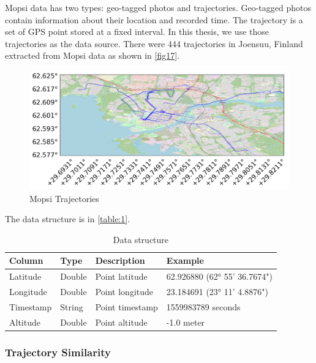 \documentclass[a4paper, 12pt]{article}
\begin{document}
Mopsi data has two types: geo-tagged photos and trajectories. Geo-tagged photos contain information about their location and recorded time. The trajectory is a set of GPS point stored at a fixed interval. In this thesis, we use those trajectories as the data source. There were 444 trajectories in Joensuu, Finland extracted from Mopsi data as shown in \autoref{fig17}.

\begin{figure}[ht]
    \centering
    \includegraphics[width=1\textwidth]{Mopsi Trajectories.png}
    \caption{Mopsi Trajectories}
    \label{fig17}
\end{figure}

The data structure is in \autoref{table:1}.

\begin{table}[h!]
    \centering
    \def\arraystretch{3}%
    \begin{tabular}{||l l l l||} 
     \hline
     \textbf{Column} & \textbf{Type} & \textbf{Description} & \textbf{Example} \\ [0.5ex] 
     \hline\hline
     Latitude & Double & Point latitude & 62.926880 (62° 55' 36.7674") \\ 
     Longitude & Double & Point longitude & 23.184691 (23° 11' 4.8876") \\
     Timestamp & String & Point timestamp & 1559983789 seconds \\
     Altitude & Double & Point altitude & -1.0 meter \\ [1ex] 
     \hline
    \end{tabular}
    \caption{Data structure}
    \label{table:1}
\end{table}

\subsubsection{Trajectory Similarity}
\end{document}
